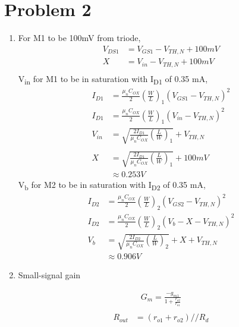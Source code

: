 \documentclass{article}
\begin{document}
\section{Problem 2}
\label{sec:orgd74c234}
\begin{enumerate}
\item For M1 to be 100mV from triode,
\begin{equation*}
\begin{aligned}
V_{DS1} &= V_{GS1} - V_{TH,N} + 100mV \\
X &= V_{in} - V_{TH,N} + 100mV \\
\end{aligned}
\end{equation*}
V\textsubscript{in} for M1 to be in saturation with I\textsubscript{D1} of 0.35 mA,
\begin{equation*}
\begin{aligned}
I_{D1} &= \frac{\mu_{n}C_{OX}}{2}(\frac{W}{L})_{1}(V_{GS1} - V_{TH,N})^2 \\
I_{D1} &= \frac{\mu_{n}C_{OX}}{2}(\frac{W}{L})_{1}(V_{in} - V_{TH,N})^2 \\
V_{in} &= \sqrt{\frac{2I_{D1}}{\mu_{n}C_{OX}}(\frac{L}{W})_{1}} + V_{TH,N} \\
\\
X &= \sqrt{\frac{2I_{D1}}{\mu_{n}C_{OX}}(\frac{L}{W})_{1}} + 100mV \\
&\approx 0.253 V
\end{aligned}
\end{equation*}
V\textsubscript{b} for M2 to be in saturation with I\textsubscript{D2} of 0.35 mA,
\begin{equation*}
\begin{aligned}
I_{D2} &= \frac{\mu_{n}C_{OX}}{2}(\frac{W}{L})_{2}(V_{GS2} - V_{TH,N})^2 \\
I_{D2} &= \frac{\mu_{n}C_{OX}}{2}(\frac{W}{L})_{2}(V_{b} - X - V_{TH,N})^2 \\
V_{b} &= \sqrt{\frac{2I_{D2}}{\mu_{n}C_{OX}}(\frac{L}{W})_{2}} + X + V_{TH,N} \\
&\approx 0.906 V

\end{aligned}
\end{equation*}

\item Small-signal gain

\begin{equation*}
\begin{aligned}
G_{m} = \frac{-g_{m1}}{1 + \frac{r_{o2}}{r_{o1}}} \\
\end{aligned}
\end{equation*}
\begin{equation*}
\begin{aligned}
R_{out} &= (r_{o1} + r_{o2}) // R_{d} \\
\end{aligned}
\end{equation*}


\end{enumerate}
\end{document}
